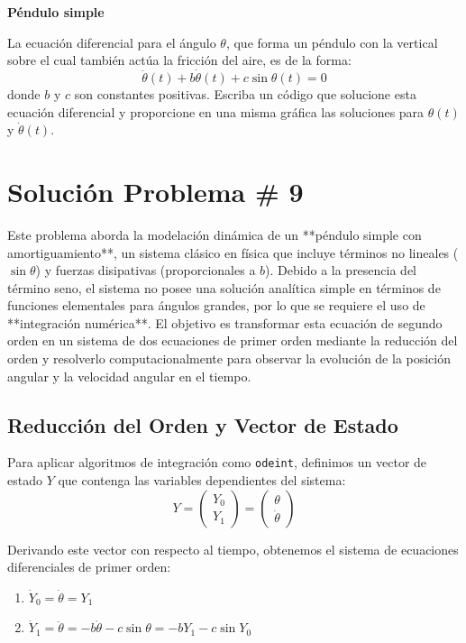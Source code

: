 \documentclass[a4paper]{article}
\begin{document}
\textbf{Péndulo simple}

La ecuación diferencial para el ángulo $\theta$, que forma un péndulo con la vertical sobre el cual también actúa la fricción del aire, es de la forma:
$$ \ddot{\theta}(t) + b\dot{\theta}(t) + c \sin \theta(t) = 0 $$
donde $b$ y $c$ son constantes positivas. Escriba un código que solucione esta ecuación diferencial y proporcione en una misma gráfica las soluciones para $\theta(t)$ y $\dot{\theta}(t)$.

\section*{Solución Problema \# 9}

Este problema aborda la modelación dinámica de un **péndulo simple con amortiguamiento**, un sistema clásico en física que incluye términos no lineales ($\sin \theta$) y fuerzas disipativas (proporcionales a $b$). Debido a la presencia del término seno, el sistema no posee una solución analítica simple en términos de funciones elementales para ángulos grandes, por lo que se requiere el uso de **integración numérica**. El objetivo es transformar esta ecuación de segundo orden en un sistema de dos ecuaciones de primer orden mediante la reducción del orden y resolverlo computacionalmente para observar la evolución de la posición angular y la velocidad angular en el tiempo.

\subsection{Reducción del Orden y Vector de Estado}

Para aplicar algoritmos de integración como \texttt{odeint}, definimos un vector de estado $Y$ que contenga las variables dependientes del sistema:
$$ Y = \begin{pmatrix} Y_0 \\ Y_1 \end{pmatrix} = \begin{pmatrix} \theta \\ \dot{\theta} \end{pmatrix} $$

Derivando este vector con respecto al tiempo, obtenemos el sistema de ecuaciones diferenciales de primer orden:
\begin{enumerate}
    \item $ \dot{Y}_0 = \dot{\theta} = Y_1 $
    \item $ \dot{Y}_1 = \ddot{\theta} = -b \dot{\theta} - c \sin \theta = -b Y_1 - c \sin Y_0 $
\end{enumerate}
\end{document}
